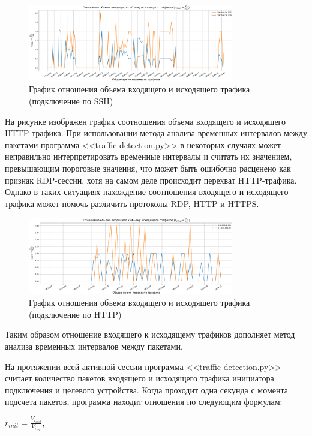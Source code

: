 \documentclass[bachelor, och, coursework]{SCWorks}
\begin{document}
\begin{figure}[H]
  \centering
  \includegraphics[width=0.8\textwidth]{photo/inout-ssh.png}
  \caption{График отношения объема входящего и исходящего трафика (подключение по SSH)}
  \label{ssh-inout}
\end{figure}

На рисунке изображен график соотношения объема входящего и исходящего HTTP-трафика. 
При использовании метода анализа временных интервалов между пакетами программа <<traffic-detection.py>> 
в некоторых случаях может неправильно интерпретировать временные интервалы и считать их значением, превышающим пороговые значения, 
что может быть ошибочно расценено как признак RDP-сессии, хотя на самом деле происходит перехват HTTP-трафика. Однако в таких 
ситуациях нахождение соотношения входящего и исходящего трафика может помочь различить протоколы RDP, HTTP и HTTPS.

\begin{figure}[H]
  \centering
  \includegraphics[width=0.8\textwidth]{photo/inout-http.png}
  \caption{График отношения объема входящего и исходящего трафика (подключение по HTTP)}
  \label{http-inout}
\end{figure}

Таким образом отношение входящего к исходящему трафиков дополняет метод анализа временных интервалов между пакетами.

На протяжении всей активной сессии программа <<traffic-detection.py>> считает количество пакетов входящего и исходящего трафика
инициатора подключения и целевого устройства. Когда проходит одна секунда с момента подсчета пакетов, программа находит отношения
по следующим формулам:

\begin{center}
  $r_{init} = \frac{V_{i_{dest}}}{V_{i_{src}}}$,
\end{center}
\end{document}
